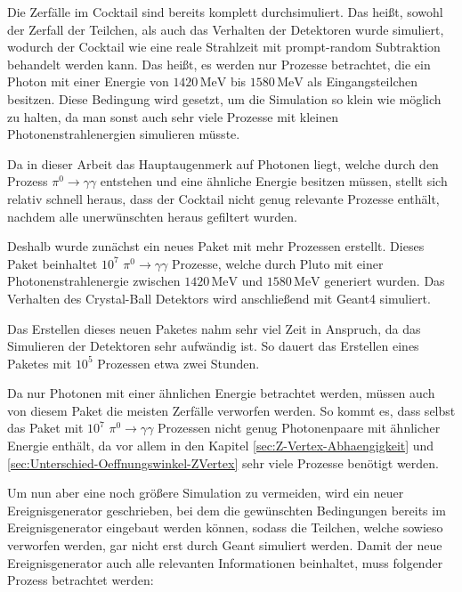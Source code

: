 \documentclass[a4paper,11pt,oneside,final,german,openbib,pdftex]{scrbook}
\begin{document}
{Die Zerf\"alle im Cocktail sind bereits komplett durchsimuliert. Das hei{\ss}t, sowohl der Zerfall der Teilchen, als auch das Verhalten der Detektoren wurde simuliert, wodurch der Cocktail wie eine reale Strahlzeit mit prompt-random Subtraktion behandelt werden kann. Das hei{\ss}t, es werden nur Prozesse betrachtet, die ein Photon mit einer Energie von $1420\,\text{MeV}$ bis $1580\,\text{MeV}$ als Eingangsteilchen besitzen. Diese Bedingung wird gesetzt, um die Simulation so klein wie m\"oglich zu halten, da man sonst auch sehr viele Prozesse mit kleinen Photonenstrahlenergien simulieren m\"usste.

Da in dieser Arbeit das Hauptaugenmerk auf Photonen liegt, welche durch den Prozess $\pi^0 \rightarrow \gamma \gamma$ entstehen und eine \"ahnliche Energie besitzen müssen, stellt sich relativ schnell heraus, dass der Cocktail nicht genug relevante Prozesse enth\"alt, nachdem alle unerw\"unschten heraus gefiltert wurden. 

Deshalb wurde zun\"achst ein neues Paket mit mehr Prozessen erstellt. 
Dieses Paket beinhaltet $10^7$ $\pi^0 \rightarrow \gamma \gamma$ Prozesse, welche durch Pluto mit einer Photonenstrahlenergie zwischen $1420\,\text{MeV}$ und $1580\,\text{MeV}$ generiert wurden. Das Verhalten des Crystal-Ball Detektors wird anschlie{\ss}end mit Geant4 simuliert.

Das Erstellen dieses neuen Paketes nahm sehr viel Zeit in Anspruch, da das Simulieren der Detektoren sehr aufw\"andig ist. So dauert das Erstellen eines Paketes mit $10^5$ Prozessen etwa zwei Stunden. 

Da nur Photonen mit einer \"ahnlichen Energie betrachtet werden, m\"ussen auch von diesem Paket die meisten Zerf\"alle verworfen werden. So kommt es, dass selbst das Paket mit $10^7$ $\pi^0 \rightarrow \gamma \gamma $ Prozessen nicht genug Photonenpaare mit \"ahnlicher Energie enth\"alt, da vor allem in den Kapitel \ref{sec:Z-Vertex-Abhaengigkeit} und \ref{sec:Unterschied-Oeffnungswinkel-ZVertex} sehr viele Prozesse ben\"otigt werden.

Um nun aber eine noch größere Simulation zu vermeiden, wird ein neuer Ereignisgenerator geschrieben, bei dem die gew\"unschten Bedingungen bereits im Ereignisgenerator eingebaut werden k\"onnen, sodass die Teilchen, welche sowieso verworfen werden, gar nicht erst durch Geant simuliert werden. 
Damit der neue Ereignisgenerator auch alle relevanten Informationen beinhaltet, muss folgender Prozess betrachtet werden:

}
\end{document}
